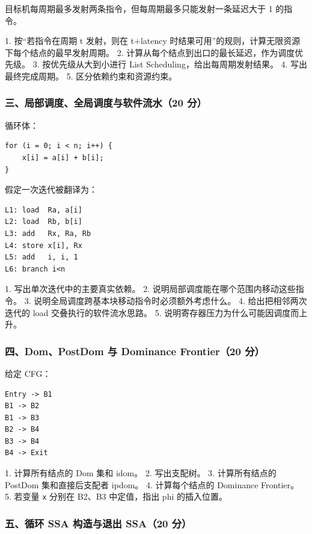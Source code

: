 \documentclass[UTF8]{ctexart}
\begin{document}
目标机每周期最多发射两条指令，但每周期最多只能发射一条延迟大于 1 的指令。

1. 按“若指令在周期 t 发射，则在 t+latency 时结果可用”的规则，计算无限资源下每个结点的最早发射周期。 2. 计算从每个结点到出口的最长延迟，作为调度优先级。 3. 按优先级从大到小进行 List Scheduling，给出每周期发射结果。 4. 写出最终完成周期。 5. 区分依赖约束和资源约束。

\subsubsection*{三、局部调度、全局调度与软件流水（20 分）}

循环体：

\begin{Verbatim}[fontsize=\small,breaklines=true]
for (i = 0; i < n; i++) {
    x[i] = a[i] + b[i];
}
\end{Verbatim}

假定一次迭代被翻译为：

\begin{Verbatim}[fontsize=\small,breaklines=true]
L1: load  Ra, a[i]
L2: load  Rb, b[i]
L3: add   Rx, Ra, Rb
L4: store x[i], Rx
L5: add   i, i, 1
L6: branch i<n
\end{Verbatim}

1. 写出单次迭代中的主要真实依赖。 2. 说明局部调度能在哪个范围内移动这些指令。 3. 说明全局调度跨基本块移动指令时必须额外考虑什么。 4. 给出把相邻两次迭代的 load 交叠执行的软件流水思路。 5. 说明寄存器压力为什么可能因调度而上升。

\subsubsection*{四、Dom、PostDom 与 Dominance Frontier（20 分）}

给定 CFG：

\begin{Verbatim}[fontsize=\small,breaklines=true]
Entry -> B1
B1 -> B2
B1 -> B3
B2 -> B4
B3 -> B4
B4 -> Exit
\end{Verbatim}

1. 计算所有结点的 Dom 集和 idom。 2. 写出支配树。 3. 计算所有结点的 PostDom 集和直接后支配者 ipdom。 4. 计算每个结点的 Dominance Frontier。 5. 若变量 \texttt{x} 分别在 B2、B3 中定值，指出 phi 的插入位置。

\subsubsection*{五、循环 SSA 构造与退出 SSA（20 分）}
\end{document}
